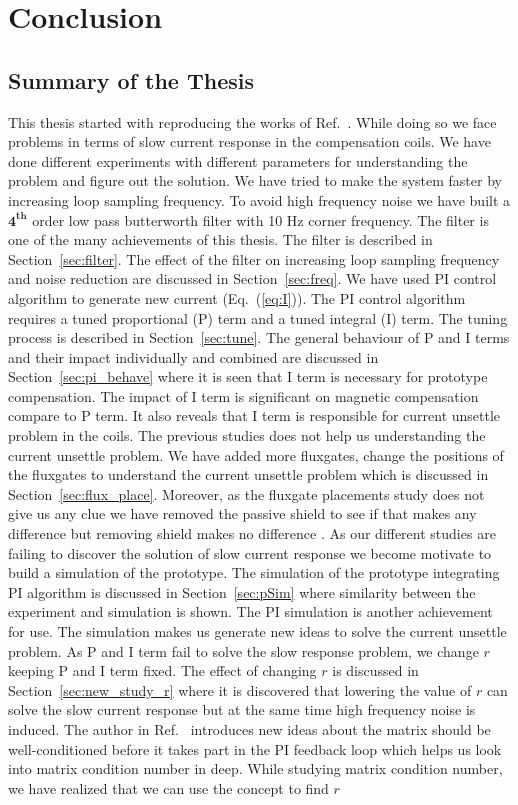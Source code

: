 \chapter{Conclusion}\label{ch:conclusion}



\section{Summary of the Thesis}
This thesis started with reproducing the works of Ref.~\cite{bea}. While doing so we face problems in terms of slow current response in the compensation coils. We have done different experiments with different parameters for understanding the problem and figure out the solution. We have tried to make the system faster by increasing loop sampling frequency. To avoid high frequency noise we have built a $\mathbf{4^{th}}$ order low pass butterworth filter with 10 Hz corner frequency. The filter is one of the many achievements of this thesis. The filter is described in Section~\ref{sec:filter}. The effect  of the filter on increasing loop sampling frequency and noise reduction are discussed in Section~\ref{sec:freq}. We have used PI control algorithm to generate new current (Eq.~(\ref{eq:I})). The PI control algorithm requires a tuned proportional (P) term and a tuned integral (I) term. The tuning process is described in Section~\ref{sec:tune}. The general behaviour of P and I terms and their impact individually and combined are discussed in Section~\ref{sec:pi_behave} where it is seen that I term is necessary for prototype compensation. The impact of I term is significant on magnetic compensation compare to P term. It also reveals that I term is responsible for current unsettle problem in the coils. The previous studies does not help us understanding the current unsettle problem. We have added more fluxgates, change the positions of the fluxgates to understand the current unsettle problem which is discussed in Section~\ref{sec:flux_place}. Moreover, as the fluxgate placements study does not give us any clue we have removed the passive shield to see if that makes any difference but removing shield makes no difference . As our different studies are failing to discover the solution of slow current response we become motivate to build a simulation of the prototype. The simulation of the prototype integrating PI algorithm is discussed in Section~\ref{sec:pSim} where similarity between the experiment and simulation is shown. The PI simulation is another achievement for use. The simulation makes us generate new ideas to solve the current unsettle problem. As P and I term fail to solve the slow response problem, we change $r$ keeping P and I term fixed. The effect of changing $r$ is discussed in Section~\ref{sec:new_study_r} where it is discovered that lowering the value of $r$ can solve the slow current response but at the same time high frequency noise is induced. The author in Ref.~\cite{rawlik} introduces new ideas about the matrix should be well-conditioned before it takes part in the PI feedback loop which helps us look into matrix condition number in deep. While studying matrix condition number, we have realized that we can use the concept to find $r$ 